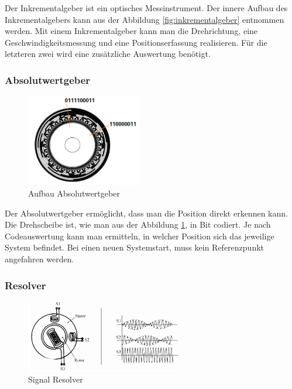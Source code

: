 Der Inkrementalgeber ist ein optisches Messinstrument. Der innere Aufbau des Inkrementalgebers kann aus der Abbildung \ref{fig:inkrementalgeber}  entnommen werden. 
Mit einem Inkrementalgeber kann man die Drehrichtung, eine Geschwindigkeitsmessung und eine Positionserfassung realisieren. Für die letzteren zwei wird eine zusätzliche Auswertung benötigt. 

\subsubsection{Absolutwertgeber}
\label{sec:absolutwertgeber}

\begin{figure}[!ht]
\begin{center}
	\caption{Aufbau Absolutwertgeber \label{fig:absolutwertgeber}}
	\includegraphics[width=0.45\textwidth]{Absolutwertgeber}
\end{center}
\end{figure}

Der Absolutwertgeber ermöglicht, dass man die Position direkt erkennen kann. Die Drehscheibe ist, wie man aus der Abbildung \ref{fig:absolutwertgeber}, in Bit codiert. Je nach Codeauswertung kann man ermitteln, in welcher Position sich das jeweilige System befindet. 
Bei einen neuen Systemstart, muss kein Referenzpunkt angefahren werden.

\subsubsection{Resolver}
\label{sec:resolver}

\begin{figure}[!ht]
\begin{center}
	\caption{Signal Resolver}
	\includegraphics[width=0.61\textwidth]{Resolver}
\end{center}
\end{figure}

